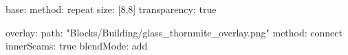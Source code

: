 base:
  method: repeat
  size: [8,8]
  transparency: true

overlay:
  path: "Blocks/Building/glass_thornmite_overlay.png"
  method: connect
  innerSeams: true
  blendMode: add